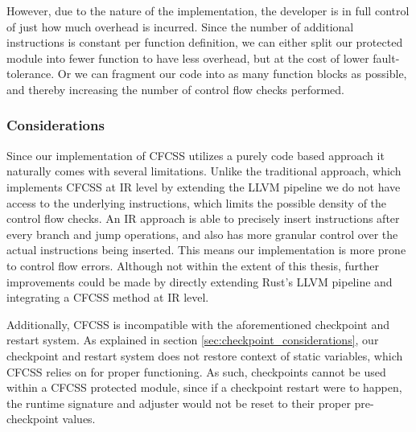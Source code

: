 However, due to the nature of the implementation, the developer is in full control of just how much overhead is incurred. Since the number of additional instructions is constant per function definition, we can either split our protected module into fewer function to have less overhead, but at the cost of lower fault-tolerance. Or we can fragment our code into as many function blocks as possible, and thereby increasing the number of control flow checks performed.

\subsubsection{Considerations}

Since our implementation of CFCSS utilizes a purely code based approach it naturally comes with several limitations. Unlike the traditional approach, which implements CFCSS at IR level by extending the LLVM pipeline we do not have access to the underlying instructions, which limits the possible density of the control flow checks. An IR approach is able to precisely insert instructions after every branch and jump operations, and also has more granular control over the actual instructions being inserted. This means our implementation is more prone to control flow errors. Although not within the extent of this thesis, further improvements could be made by directly extending Rust's LLVM pipeline and integrating a CFCSS method at IR level.

Additionally, CFCSS is incompatible with the aforementioned checkpoint and restart system. As explained in section \ref{sec:checkpoint_considerations}, our checkpoint and restart system does not restore context of static variables, which CFCSS relies on for proper functioning. As such, checkpoints cannot be used within a CFCSS protected module, since if a checkpoint restart were to happen, the runtime signature and adjuster would not be reset to their proper pre-checkpoint values.